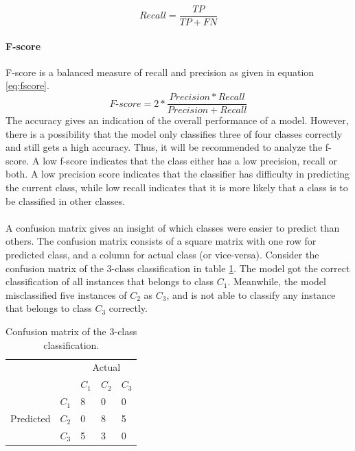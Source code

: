 \documentclass[USenglish]{ifimaster}  %
\begin{document}
	\begin{equation}
	Recall = \frac{TP}{TP + FN}
	\label{eq:recall}
	\end{equation}
	
	\paragraph{F-score}
	F-score is a balanced measure of recall and precision as given in equation \ref{eq:fscore}.
	\begin{equation}
	\textit{F-score} = 2*\frac{Precision*Recall}{Precision + Recall}
	\label{eq:fscore}
	\end{equation}
	\FloatBarrier
The accuracy gives an indication of the overall performance of a model. However, there is a possibility that the model only classifies three of four classes correctly and still gets a high accuracy. Thus, it will be recommended to analyze the f-score. A low f-score indicates that the class either has a low precision, recall or both. A low precision score indicates that the classifier has difficulty in predicting the current class, while low recall indicates that it is more likely that a class is to be classified in other classes.
\\
\\
A confusion matrix gives an insight of which classes were easier to predict than others. The confusion matrix consists of a square matrix with one row for predicted class, and a column for actual class (or vice-versa). Consider the confusion matrix of the 3-class classification in table \ref{tab:cmatrix}. The model got the correct classification of all instances that belongs to class $C_1$. Meanwhile, the model misclassified five instances of $C_2$ as $C_3$, and is not able to classify any instance that belongs to class $C_3$ correctly. 
	
	\begin{table}[h]
		\centering
		\begin{tabular}{ll|l|l|l|}
			\cline{3-5}
			&  & \multicolumn{3}{c|}{Actual} \\ \cline{3-5} 
			&  & $C_1$ & $C_2$ & $C_3$ \\ \hline
			\multicolumn{1}{|l|}{\multirow{3}{*}{Predicted}} & $C_1$ & 8 & 0 & 0 \\ \cline{2-5} 
			\multicolumn{1}{|l|}{} & $C_2$ & 0 & 8 & 5 \\ \cline{2-5} 
			\multicolumn{1}{|l|}{} & $C_3$ & 5 & 3 & 0 \\ \hline
		\end{tabular}
		\caption[Confusion matrix of the 3-class classification]{Confusion matrix of the 3-class classification.}
		\label{tab:cmatrix}
	\end{table}
	
\end{document}
